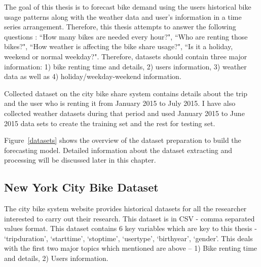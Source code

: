 The goal of this thesis is to forecast bike demand using the users historical bike usage patterns along with the weather data and user's information in a time series arrangement. Therefore, this thesis attempts to answer the following questions : ``How many bikes are needed every hour?", ``Who are renting those bikes?", ``How weather is affecting the bike share usage?", ``Is it a holiday, weekend or normal weekday?". Therefore, datasets should contain three major information: 1) bike renting time and details, 2) users information, 3) weather data as well as 4) holiday/weekday-weekend information.

Collected dataset on the city bike share system contains details about the trip and the user who is renting it from January 2015 to July 2015. I have also collected weather datasets during that period and used January 2015 to June 2015 data sets to create the training set and the rest for testing set. 

Figure~\ref{datasets} shows the overview of the dataset preparation to build the forecasting model. Detailed information about the dataset extracting and processing will be discussed later in this chapter. 



\begin{figure}
\centering
{}
\end{figure}


\subsection {New York City Bike Dataset}
\label{NYCdata}

The city bike system website provides historical datasets for all the researcher interested to carry out their research. This dataset is in CSV - comma separated values format. This dataset contains 6 key variables which are key to this thesis - `tripduration', `starttime', `stoptime', `usertype', `birthyear', `gender'.  This deals with the first two major topics which mentioned are above – 1) Bike renting time and details, 2) Users information. 

